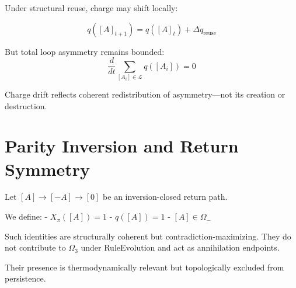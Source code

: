 Under structural reuse, charge may shift locally:

\[
q([A]_{t+1}) = q([A]_t) + \Delta q_{\text{reuse}}
\]

But total loop asymmetry remains bounded:
\[
\frac{d}{dt} \sum_{[A_i] \in \mathcal{L}} q([A_i]) = 0
\]

Charge drift reflects coherent redistribution of asymmetry—not its creation or destruction.

\section{Parity Inversion and Return Symmetry} \label{sec:parity}

Let $[A] \to [-A] \to [0]$ be an inversion-closed return path.

We define:
- $X_\pi([A]) = 1$
- $q([A]) = 1$
- $[A] \in \Omega_-$

Such identities are structurally coherent but contradiction-maximizing. They do not contribute to $\Omega_3$ under RuleEvolution and act as annihilation endpoints.

Their presence is thermodynamically relevant but topologically excluded from persistence.

